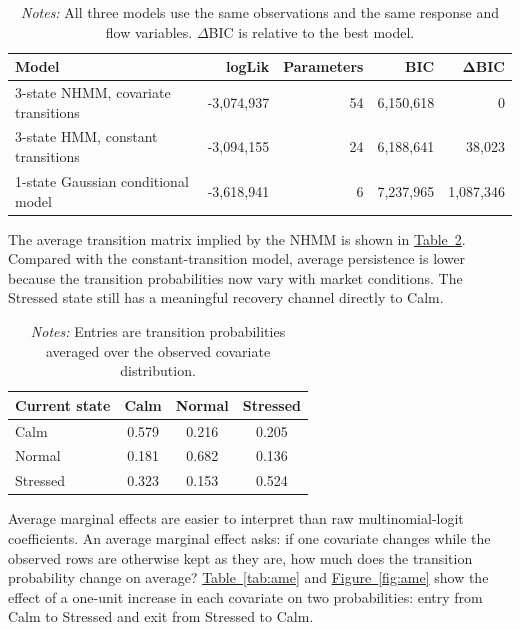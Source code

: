 \documentclass[12pt,a4paper]{article}
\newcommand{\tabref}[1]{\hyperref[#1]{Table~\ref*{#1}}}
\newcommand{\figref}[1]{\hyperref[#1]{Figure~\ref*{#1}}}
\begin{document}
\begin{table}[!htbp]
\centering
\caption{Model comparison on the primary 30-second sample}
\small
\begin{tabular}{lrrrr}
\toprule
\textbf{Model} & \textbf{logLik} & \textbf{Parameters} & \textbf{BIC} & \(\boldsymbol{\Delta}\)\textbf{BIC} \\
\midrule
3-state NHMM, covariate transitions & -3,074,937 & 54 & 6,150,618 & 0 \\
3-state HMM, constant transitions & -3,094,155 & 24 & 6,188,641 & 38,023 \\
1-state Gaussian conditional model & -3,618,941 & 6 & 7,237,965 & 1,087,346 \\
\bottomrule
\end{tabular}
\caption*{\footnotesize\emph{Notes:} All three models use the same observations and the same response and flow variables. \(\Delta\)BIC is relative to the best model.}
\label{tab:model_comparison}
\end{table}

The average transition matrix implied by the NHMM is shown in \tabref{tab:nhmm_transition}. Compared with the constant-transition model, average persistence is lower because the transition probabilities now vary with market conditions. The Stressed state still has a meaningful recovery channel directly to Calm.

\begin{table}[!htbp]
\centering
\caption{NHMM average implied transition matrix}
\small
\begin{tabular}{lccc}
\toprule
\textbf{Current state} & \textbf{Calm} & \textbf{Normal} & \textbf{Stressed} \\
\midrule
Calm & 0.579 & 0.216 & 0.205 \\
Normal & 0.181 & 0.682 & 0.136 \\
Stressed & 0.323 & 0.153 & 0.524 \\
\bottomrule
\end{tabular}
\caption*{\footnotesize\emph{Notes:} Entries are transition probabilities averaged over the observed covariate distribution.}
\label{tab:nhmm_transition}
\end{table}

Average marginal effects are easier to interpret than raw multinomial-logit coefficients. An average marginal effect asks: if one covariate changes while the observed rows are otherwise kept as they are, how much does the transition probability change on average? \tabref{tab:ame} and \figref{fig:ame} show the effect of a one-unit increase in each covariate on two probabilities: entry from Calm to Stressed and exit from Stressed to Calm.
\end{document}

